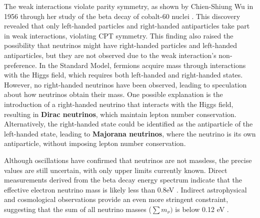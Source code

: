 The weak interactions violate parity symmetry, as shown by Chien-Shiung Wu in 1956 through her study of the beta decay of cobalt-60 nuclei . This discovery revealed that only left-handed particles and right-handed antiparticles take part in weak interactions, violating CPT symmetry. This finding also raised the possibility that neutrinos might have right-handed particles and left-handed antiparticles, but they are not observed due to the weak interaction's non-preference. In the Standard Model, fermions acquire mass through interactions with the Higgs field, which requires both left-handed and right-handed states. However, no right-handed neutrinos have been observed, leading to speculation about how neutrinos obtain their mass. One possible explanation is the introduction of a right-handed neutrino that interacts with the Higgs field, resulting in \textbf{Dirac neutrinos}, which maintain lepton number conservation. Alternatively, the right-handed state could be identified as the antiparticle of the left-handed state, leading to \textbf{Majorana neutrinos}, where the neutrino is its own antiparticle, without imposing lepton number conservation.

Although oscillations have confirmed that neutrinos are not massless, the precise values are still uncertain, with only upper limits currently known. Direct measurements derived from the beta decay energy spectrum indicate that the effective electron neutrino mass is likely less than 0.8eV . Indirect astrophysical and cosmological observations provide an even more stringent constraint, suggesting that the sum of all neutrino masses ($\sum{{m}_{\nu}})$ is below 0.12 eV . 

